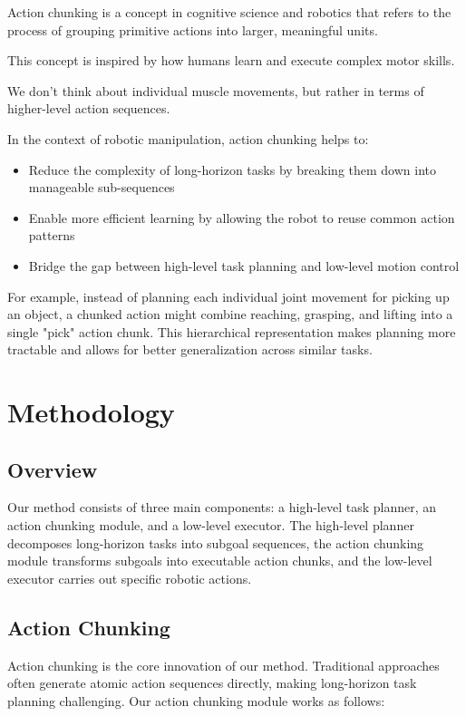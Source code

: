 \documentclass{article}
\begin{document}
Action chunking is a concept in cognitive science and robotics that refers to the process of grouping primitive actions into larger, meaningful units.

This concept is inspired by how humans learn and execute complex motor skills.

We don't think about individual muscle movements, but rather in terms of higher-level action sequences.

In the context of robotic manipulation, action chunking helps to:

\begin{itemize}
    \item Reduce the complexity of long-horizon tasks by breaking them down into manageable sub-sequences
    \item Enable more efficient learning by allowing the robot to reuse common action patterns
    \item Bridge the gap between high-level task planning and low-level motion control
\end{itemize}

For example, instead of planning each individual joint movement for picking up an object, a chunked action might combine reaching, grasping, and lifting into a single "pick" action chunk. This hierarchical representation makes planning more tractable and allows for better generalization across similar tasks.


\section{Methodology}

\subsection{Overview}

Our method consists of three main components: a high-level task planner, an action chunking module, and a low-level executor. The high-level planner decomposes long-horizon tasks into subgoal sequences, the action chunking module transforms subgoals into executable action chunks, and the low-level executor carries out specific robotic actions.

\subsection{Action Chunking}

Action chunking is the core innovation of our method. Traditional approaches often generate atomic action sequences directly, making long-horizon task planning challenging. Our action chunking module works as follows:
\end{document}
